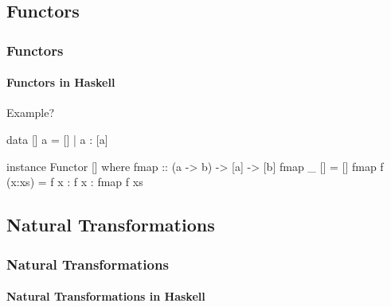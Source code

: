 \documentclass{beamer}
\begin{document}

\subsection{Functors}


\begin{frame}[fragile]
  \frametitle{Functors}
  \framesubtitle{Functors in Haskell}

  \begin{alertblock}{Example?}
    \begin{code}
data [] a = [] | a : [a]

instance Functor [] where
  fmap :: (a -> b) -> [a] -> [b]
  fmap _ []     = []
  fmap f (x:xs) = f x : f x : fmap f xs
    \end{code}
  \end{alertblock}

\end{frame}


\subsection{Natural Transformations}


\begin{frame}[fragile]
  \frametitle{Natural Transformations}
  \framesubtitle{Natural Transformations in Haskell}

  \begin{example}
    \begin{center}
    \end{center}
  \end{example}

\end{frame}
\end{document}
